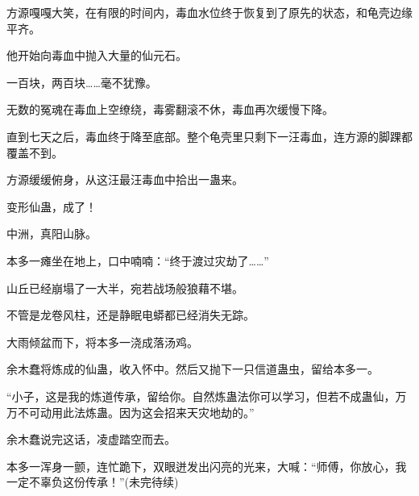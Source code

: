 \begin{this_body}
方源嘎嘎大笑，在有限的时间内，毒血水位终于恢复到了原先的状态，和龟壳边缘平齐。

他开始向毒血中抛入大量的仙元石。

一百块，两百块……毫不犹豫。

无数的冤魂在毒血上空缭绕，毒雾翻滚不休，毒血再次缓慢下降。

直到七天之后，毒血终于降至底部。整个龟壳里只剩下一汪毒血，连方源的脚踝都覆盖不到。

方源缓缓俯身，从这汪最汪毒血中拾出一蛊来。

变形仙蛊，成了！

中洲，真阳山脉。

本多一瘫坐在地上，口中喃喃：“终于渡过灾劫了……”

山丘已经崩塌了一大半，宛若战场般狼藉不堪。

不管是龙卷风柱，还是静眠电蟒都已经消失无踪。

大雨倾盆而下，将本多一浇成落汤鸡。

余木蠢将炼成的仙蛊，收入怀中。然后又抛下一只信道蛊虫，留给本多一。

“小子，这是我的炼道传承，留给你。自然炼蛊法你可以学习，但若不成蛊仙，万万不可动用此法炼蛊。因为这会招来天灾地劫的。”

余木蠢说完这话，凌虚踏空而去。

本多一浑身一颤，连忙跪下，双眼迸发出闪亮的光来，大喊：“师傅，你放心，我一定不辜负这份传承！”(未完待续)

\end{this_body}

